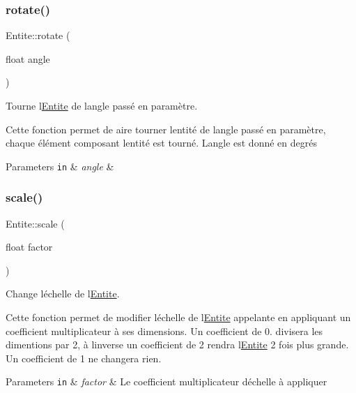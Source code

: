 \subsubsection{\texorpdfstring{rotate()}{rotate()}}
{\footnotesize\ttfamily Entite\+::rotate (\begin{DoxyParamCaption}\item[{float}]{angle }\end{DoxyParamCaption})}



Tourne l\textquotesingle{}\mbox{\hyperlink{class_entite}{Entite}} de l\textquotesingle{}angle passé en paramètre. 

Cette fonction permet de aire tourner l\textquotesingle{}entité de l\textquotesingle{}angle passé en paramètre, chaque élément composant l\textquotesingle{}entité est tourné. L\textquotesingle{}angle est donné en degrés 
\begin{DoxyParams}[1]{Parameters}
\mbox{\tt in}  & {\em angle} & \\
\hline
\end{DoxyParams}
\mbox{\label{class_entite_a770f6c53856606c4de768bb942299659}} 
\subsubsection{\texorpdfstring{scale()}{scale()}}
{\footnotesize\ttfamily Entite\+::scale (\begin{DoxyParamCaption}\item[{float}]{factor }\end{DoxyParamCaption})}



Change l\textquotesingle{}échelle de l\textquotesingle{}\mbox{\hyperlink{class_entite}{Entite}}. 

Cette fonction permet de modifier l\textquotesingle{}échelle de l\textquotesingle{}\mbox{\hyperlink{class_entite}{Entite}} appelante en appliquant un coefficient multiplicateur à ses dimensions. Un coefficient de 0. divisera les dimentions par 2, à l\textquotesingle{}inverse un coefficient de 2 rendra l\textquotesingle{}\mbox{\hyperlink{class_entite}{Entite}} 2 fois plus grande. Un coefficient de 1 ne changera rien. 
\begin{DoxyParams}[1]{Parameters}
\mbox{\tt in}  & {\em factor} & Le coefficient multiplicateur d\textquotesingle{}échelle à appliquer \\
\hline
\end{DoxyParams}
\mbox{\label{class_entite_a7b8614d3a7ed5f56ac295e34845310b7}} 
